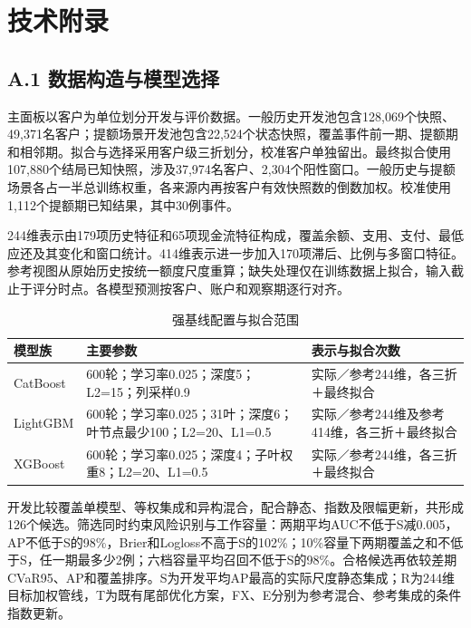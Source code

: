 \clearpage{}\section*{技术附录}
\setcounter{table}{0}\setcounter{figure}{0}
\subsection*{A.1 数据构造与模型选择}
主面板以客户为单位划分开发与评价数据。一般历史开发池包含128,069个快照、49,371名客户；提额场景开发池包含22,524个状态快照，覆盖事件前一期、提额期和相邻期。拟合与选择采用客户级三折划分，校准客户单独留出。最终拟合使用107,880个结局已知快照，涉及37,974名客户、2,304个阳性窗口。一般历史与提额场景各占一半总训练权重，各来源内再按客户有效快照数的倒数加权。校准使用1,112个提额期已知结果，其中30例事件。

244维表示由179项历史特征和65项现金流特征构成，覆盖余额、支用、支付、最低应还及其变化和窗口统计。414维表示进一步加入170项滞后、比例与多窗口特征。参考视图从原始历史按统一额度尺度重算；缺失处理仅在训练数据上拟合，输入截止于评分时点。各模型预测按客户、账户和观察期逐行对齐。

\begin{table}[H]\centering\caption{强基线配置与拟合范围}\small
\begin{tabularx}{\linewidth}{@{}p{23mm}YY@{}}\toprule
模型族 & 主要参数 & 表示与拟合次数\\\midrule
CatBoost & 600轮；学习率0.025；深度5；L2=15；列采样0.9 & 实际／参考244维，各三折＋最终拟合\\
LightGBM & 600轮；学习率0.025；31叶；深度6；叶节点最少100；L2=20、L1=0.5 & 实际／参考244维及参考414维，各三折＋最终拟合\\
XGBoost & 600轮；学习率0.025；深度4；子叶权重8；L2=20、L1=0.5 & 实际／参考244维，各三折＋最终拟合\\\bottomrule
\end{tabularx}\end{table}

开发比较覆盖单模型、等权集成和异构混合，配合静态、指数及限幅更新，共形成126个候选。筛选同时约束风险识别与工作容量：两期平均AUC不低于S减0.005，AP不低于S的98\%，Brier和Logloss不高于S的102\%；10\%容量下两期覆盖之和不低于S，任一期最多少2例；六档容量平均召回不低于S的98\%。合格候选再依较差期CVaR95、AP和覆盖排序。S为开发平均AP最高的实际尺度静态集成；R为244维目标加权管线，T为既有尾部优化方案，FX、E分别为参考混合、参考集成的条件指数更新。

